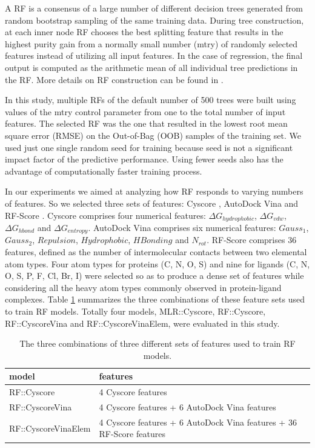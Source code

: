 A RF \citep{1309} is a consensus of a large number of different decision trees generated from random bootstrap sampling of the same training data. During tree construction, at each inner node RF chooses the best splitting feature that results in the highest purity gain from a normally small number (mtry) of randomly selected features instead of utilizing all input features. In the case of regression, the final output is computed as the arithmetic mean of all individual tree predictions in the RF. More details on RF construction can be found in \citep{564,1362}.

In this study, multiple RFs of the default number of 500 trees were built using values of the mtry control parameter from one to the total number of input features. The selected RF was the one that resulted in the lowest root mean square error (RMSE) on the Out-of-Bag (OOB) samples of the training set. We used just one single random seed for training because seed is not a significant impact factor of the predictive performance. Using fewer seeds also has the advantage of computationally faster training process.

In our experiments we aimed at analyzing how RF responds to varying numbers of features. So we selected three sets of features: Cyscore \citep{1372}, AutoDock Vina \citep{595} and RF-Score \citep{564}. Cyscore comprises four numerical features: $\Delta G_{hydrophobic}$, $\Delta G_{vdw}$, $\Delta G_{hbond}$ and $\Delta G_{entropy}$. AutoDock Vina comprises six numerical features: $Gauss_1$, $Gauss_2$, $Repulsion$, $Hydrophobic$, $HBonding$ and $N_{rot}$. RF-Score comprises 36 features, defined as the number of intermolecular contacts between two elemental atom types. Four atom types for proteins (C, N, O, S) and nine for ligands (C, N, O, S, P, F, Cl, Br, I) were selected so as to produce a dense set of features while considering all the heavy atom types commonly observed in protein-ligand complexes. Table \ref{rfcyscore:features} summarizes the three combinations of these feature sets used to train RF models. Totally four models, MLR::Cyscore, RF::Cyscore, RF::CyscoreVina and RF::CyscoreVinaElem, were evaluated in this study.

\begin{table}
\caption{The three combinations of three different sets of features used to train RF models.}
\label{rfcyscore:features}
\begin{tabular}{ll}
\hline
model & features\\
\hline
RF::Cyscore         & 4 Cyscore features\\
RF::CyscoreVina     & 4 Cyscore features + 6 AutoDock Vina features\\
RF::CyscoreVinaElem & 4 Cyscore features + 6 AutoDock Vina features + 36 RF-Score features\\
\hline
\end{tabular}
\end{table}

